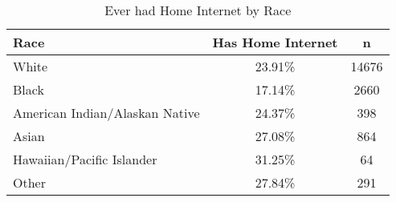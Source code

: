 \documentclass{article}
\begin{document}
\begin{table}[ht]
\centering
\begin{tabular}{lcc}
  \hline
  Race & Has Home Internet & n \\ 
  \hline
  White & 23.91\% & 14676 \\ 
  Black & 17.14\% & 2660 \\ 
  American Indian/Alaskan Native & 24.37\% & 398 \\ 
  Asian & 27.08\% & 864 \\ 
  Hawaiian/Pacific Islander & 31.25\% &  64 \\ 
  Other & 27.84\% & 291 \\ 
   \hline
\end{tabular}
\caption*{Ever had Home Internet by Race} 
\end{table}
\end{document}
